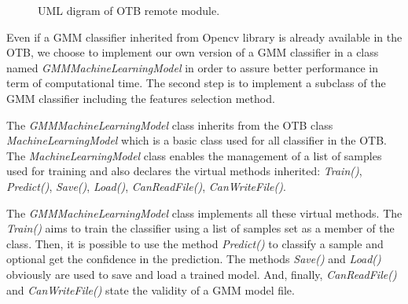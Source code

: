\documentclass[a4paper,11pt,DIV=16,abstracton]{scrartcl}
\begin{document}
\begin{figure}[!ht]
        \caption{UML digram of OTB remote module.\label{fig:uml}}
    \end{figure}

    Even if a GMM classifier inherited from Opencv library is already available in the OTB, we choose to implement our own version of a GMM classifier in a class named \emph{GMMMachineLearningModel} in order to assure better performance in term of computational time. The second step is to implement a subclass of the GMM classifier including the features selection method.

    The \emph{GMMMachineLearningModel} class inherits from the OTB class \emph{MachineLearningModel} which is a basic class used for all classifier in the OTB. The \emph{MachineLearningModel} class enables the management of a list of samples used for training and also declares the virtual methods inherited: \emph{Train()}, \emph{Predict()}, \emph{Save()}, \emph{Load()}, \emph{CanReadFile()}, \emph{CanWriteFile()}.

    The \emph{GMMMachineLearningModel} class implements all these virtual methods. The \emph{Train()} aims to train the classifier using a list of samples set as a member of the class. Then, it is possible to use the method \emph{Predict()} to classify a sample and optional get the confidence in the prediction. The methods \emph{Save()} and \emph{Load()} obviously are used to save and load a trained model. And, finally, \emph{CanReadFile()} and \emph{CanWriteFile()} state the validity of a GMM model file.
\end{document}
